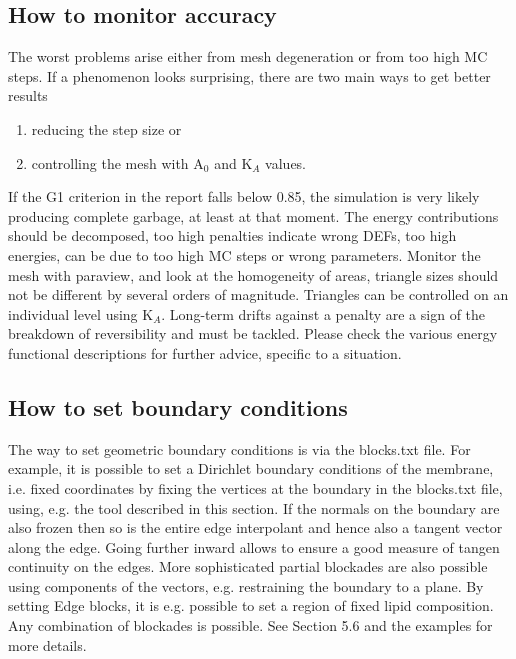 \documentclass[11pt]{article}
\begin{document}
\subsection{How to monitor accuracy}

The worst problems arise either from mesh degeneration or from too high MC steps. If a phenomenon looks surprising, there are two main ways to get better results
\begin{enumerate}
    \item reducing the step size or 
    \item controlling the mesh with A$_0$ and K$_A$ values.
\end{enumerate}
If the G1 criterion in the report falls below 0.85, the simulation is very likely producing complete garbage, at least at that moment. 
The energy contributions should be decomposed, too high penalties indicate wrong DEFs, too high energies, can be due to too high MC steps or wrong parameters. 
Monitor the mesh with paraview, and look at the homogeneity of areas, triangle sizes should not be different by several orders of magnitude.
Triangles can be controlled on an individual level using K$_A$.
Long-term drifts against a penalty are a sign of the breakdown of reversibility and must be tackled. Please check the various energy functional descriptions for further advice, specific to a situation.

\subsection{How to set boundary conditions}

The way to set geometric boundary conditions is via the blocks.txt file. For example, it is possible to set a Dirichlet boundary conditions of the membrane, i.e. fixed coordinates by fixing the vertices at the boundary in the blocks.txt file, using, e.g. the tool described in this section. If the normals on the boundary are also frozen then so is the entire edge interpolant and hence also a tangent vector along the edge. 
Going further inward allows to ensure a good measure of tangen continuity on the edges. More sophisticated partial blockades are also possible using components of the vectors, e.g. restraining the boundary to a plane. By setting Edge blocks, it is e.g. possible to set a region of fixed lipid composition. Any combination of blockades is possible. See Section 5.6 and the examples for more details.


\end{document}
